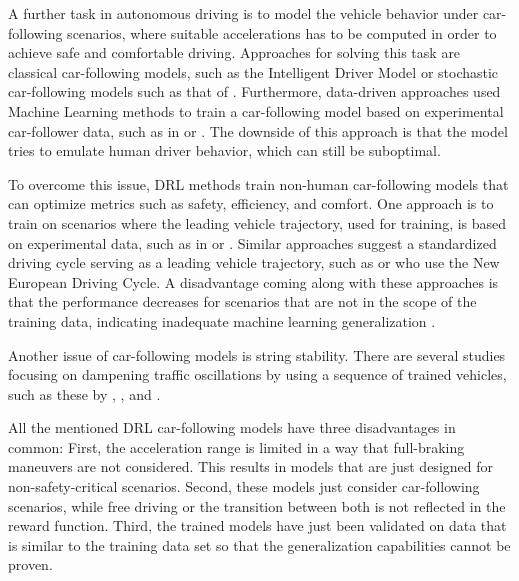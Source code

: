 \documentclass[review]{elsarticle}
\providecommand{\martin}[1]{#1}                  %
\providecommand{\martinc}[1]{}                  %
\providecommand{\3}{{\ss}}
\begin{document}
A further task in autonomous driving is to model the vehicle behavior
under car-following scenarios, where suitable accelerations has to be
computed in order to achieve safe and comfortable driving. Approaches
for solving this task are classical car-following models, such as the
Intelligent Driver Model \citep{Opus} or stochastic car-following
models \martin{such as that of} \cite{Treiber2018stochIDM_TRB}. Furthermore, data-driven approaches used Machine Learning methods to train a car-following model based on experimental car-follower data, such as in \cite{Chong2011SimulationOD} or \cite{ZHOU2017245}. The downside of this approach is that the model tries to emulate human driver behavior, which can still be suboptimal.

To overcome this issue, DRL methods train non-human car-following models that can optimize metrics such as safety, efficiency, and comfort. 
One approach is to train on scenarios where the leading vehicle
trajectory, used for training, is based on experimental data, such as
in \cite{SafeEfficientAndComfortable} or
\cite{HumanLikeAutonomouCF}. Similar approaches suggest a standardized
driving cycle \martin{serving as a} leading vehicle trajectory, such
as \cite{ComparisonRLvsMPC} or \cite{CFelectricVehicle}
\martin{who}\martinc{relative clauses mit Menschen: ``who'' statt
  ``which'' oder ``that''} use the New European Driving Cycle.
A disadvantage coming along with these approaches is that the
performance decreases for scenarios \martin{that} are not in the scope of the training data, indicating inadequate machine learning generalization \citep{ComparisonRLvsMPC}. 

Another issue of car-following models is string stability. There are
several studies focusing on dampening traffic oscillations by using a
sequence of trained vehicles, such as these by \cite{qu2020jointly}, \cite{DissipatingStopAndGoWaves}, and \cite{DampenStopAndGoTraffic}.

All the mentioned DRL car-following models have three disadvantages in
common: First, the acceleration range is limited in a way that
full-braking maneuvers are not considered. This results in models that are just designed for non-safety-critical scenarios. Second, these models just consider car-following scenarios, while free driving or the transition between both is not reflected in the reward function. Third, the trained models have just been validated on data that is similar to the training data set so that the generalization capabilities cannot be proven. 
\end{document}
